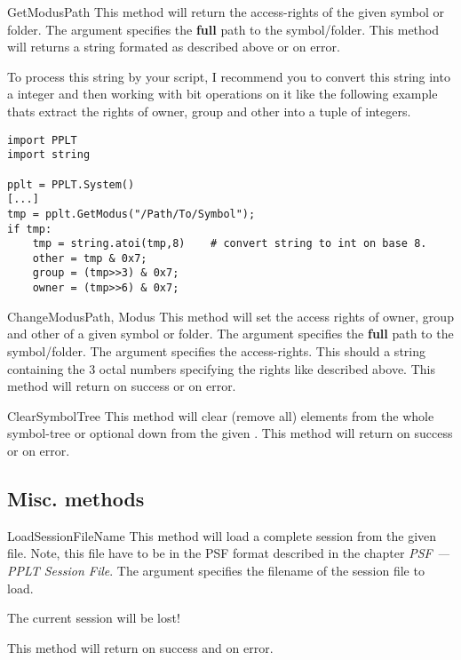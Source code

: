 \begin{methoddesc}[System]{GetModus}{Path}
This method will return the access-rights of the given symbol or folder.
The argument  specifies the \textbf{full} path to the symbol/folder.
This method will returns a string formated as described above or 
on error. 

To process this string by your script, I recommend you to convert this string 
into a integer and then working with bit operations on it like the following 
example thats extract the rights of owner, group and other into a tuple of 
integers.
\begin{verbatim}
import PPLT
import string

pplt = PPLT.System()
[...]
tmp = pplt.GetModus("/Path/To/Symbol");
if tmp:
    tmp = string.atoi(tmp,8)    # convert string to int on base 8.
    other = tmp & 0x7;
    group = (tmp>>3) & 0x7;
    owner = (tmp>>6) & 0x7;
\end{verbatim}    
\end{methoddesc}


\begin{methoddesc}[System]{ChangeModus}{Path, Modus}
This method will set the access rights of owner, group and other
of a given symbol or folder. The argument  specifies the 
\textbf{full} path to the symbol/folder. The argument  specifies
the access-rights. This should a string containing the 3 octal numbers 
specifying the rights like described above. This method will return 
 on success or  on error.
\end{methoddesc}


\begin{methoddesc}[System]{ClearSymbolTree}{}
This method will clear (remove all) elements from the whole symbol-tree or
optional down from the given . This method will return 
 on success or  on error.
\end{methoddesc}




\subsection{Misc. methods}
\begin{methoddesc}[System]{LoadSession}{FileName}
This method will load a complete session from the given file. Note, this file
have to be in the PSF format described in the chapter 
\emph{PSF --- PPLT Session File}. The argument  specifies the
filename of the session file to load.
\begin{notice} 
The current session will be lost! 
\end{notice}
This method will return  on success and  on error.
\end{methoddesc}


